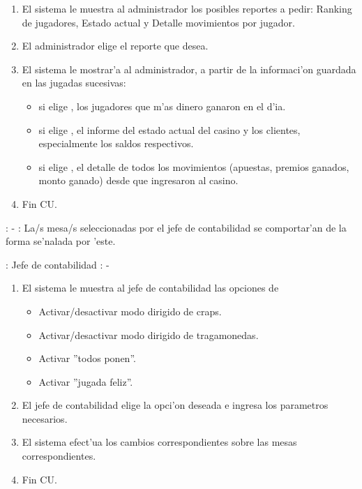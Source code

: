 \begin{enumerate}
\item El sistema le muestra al administrador los posibles reportes a pedir: Ranking de jugadores, Estado actual y Detalle movimientos por jugador.
\item El administrador elige el reporte que desea.
\item El sistema le mostrar'a al administrador, a partir de la informaci'on guardada en las jugadas sucesivas:
	\begin{itemize}
	\item si elige , los jugadores que m'as dinero ganaron en el d'ia.
	\item si elige , el informe del estado actual del casino y los clientes, especialmente los saldos respectivos.
	\item si elige , el detalle de todos los movimientos (apuestas, premios ganados, monto ganado) desde que ingresaron al casino.
	\end{itemize}
\item Fin CU.
\end{enumerate}




: - \newline
\indent{}: La/s mesa/s seleccionadas por el jefe de contabilidad se comportar'an de la forma se'nalada por 'este.

: Jefe de contabilidad \newline
\indent{}: -

\begin{enumerate}
\item El sistema le muestra al jefe de contabilidad las opciones de
	\begin{itemize}
	\item Activar/desactivar modo dirigido de craps.
	\item Activar/desactivar modo dirigido de tragamonedas.
	\item Activar ''todos ponen''.
	\item Activar ''jugada feliz''.
	\end{itemize}
\item El jefe de contabilidad elige la opci'on deseada e ingresa los parametros necesarios.
\item El sistema efect'ua los cambios correspondientes sobre las mesas correspondientes.
\item Fin CU.
\end{enumerate}



